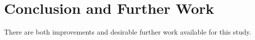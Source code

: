 \chapter{Conclusion and Further Work}
There are both improvements and desirable further work available for this study. 




